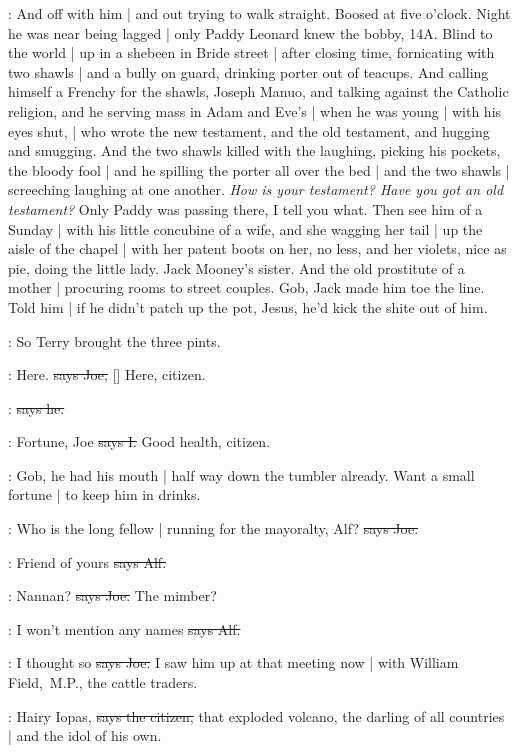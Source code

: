 \Nq:
And off with him |
and out trying to walk straight.
Boosed at five o'clock.
Night he was near being lagged |
only Paddy Leonard knew the bobby,
14A.
Blind to the world |
up in a shebeen in Bride street |
after closing time,
fornicating with two shawls |
and a bully on guard,
drinking porter out of teacups.
And calling himself a Frenchy for the shawls,
Joseph Manuo,
and talking against the Catholic religion,
and he serving mass in Adam and Eve's |
when he was young |
with his eyes shut, |
who wrote the new testament,
and the old testament,
and hugging and smugging.
And the two shawls killed with the laughing,
picking his pockets,
the bloody fool |
and he spilling the porter all over the bed |
and the two shawls |
screeching laughing at one another.%
\emph{How is your testament?
Have you got an old testament?}
Only Paddy was passing there,
I tell you what.
Then see him of a Sunday |
with his little concubine of a wife,
and she wagging her tail |
up the aisle of the chapel |
with her patent boots on her,
no less,
and her violets,
nice as pie,
doing the little lady.
Jack Mooney's sister.
And the old prostitute of a mother |
procuring rooms to street couples.
Gob,
Jack made him toe the line.
Told him |
if he didn't patch up the pot,
Jesus,
he'd kick the shite out of him.

\Nq:
So Terry brought the three pints.

\joe:
Here.
\sout{says Joe,}
[]
Here,
citizen.

\citizen:
\sout{says he.}

:
Fortune,
Joe
\sout{says I.}
Good health,
citizen.

\Nq:
Gob,
he had his mouth |
half way down the tumbler already.
Want a small fortune |
to keep him in drinks.

\joe:
Who is the long fellow |
running for the mayoralty,
Alf?
\sout{says Joe.}

\bergan:
Friend of yours
\sout{says Alf.}

\joe:
Nannan?
\sout{says Joe.}
The mimber?

\bergan:
I won't mention any names
\sout{says Alf.}

\joe:
I thought so
\sout{says Joe.}
I saw him up at that meeting now |
with William Field,~M.P.,
the cattle traders.

\citizen:
Hairy Iopas,
\sout{says the citizen,}
that exploded volcano,
the darling of all countries
 |
and the idol of his own.

